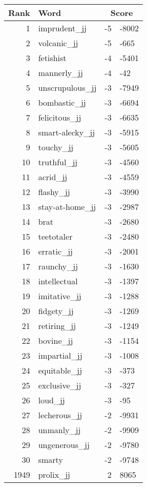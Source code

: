 \begin{longtable}[!htbp]{| rlr@{.}l |}
    \hline
    \textbf{Rank} & \textbf{Word} & \multicolumn{2}{c|}{\textbf{Score}} \\
    \hline
    \endhead
    1 & imprudent\_jj & -5 & -8002 \\
    2 & volcanic\_jj & -5 & -665 \\
    3 & fetishist & -4 & -5401 \\
    4 & mannerly\_jj & -4 & -42 \\
    5 & unscrupulous\_jj & -3 & -7949 \\
    6 & bombastic\_jj & -3 & -6694 \\
    7 & felicitous\_jj & -3 & -6635 \\
    8 & smart-alecky\_jj & -3 & -5915 \\
    9 & touchy\_jj & -3 & -5605 \\
    10 & truthful\_jj & -3 & -4560 \\
    11 & acrid\_jj & -3 & -4559 \\
    12 & flashy\_jj & -3 & -3990 \\
    13 & stay-at-home\_jj & -3 & -2987 \\
    14 & brat & -3 & -2680 \\
    15 & teetotaler & -3 & -2480 \\
    16 & erratic\_jj & -3 & -2001 \\
    17 & raunchy\_jj & -3 & -1630 \\
    18 & intellectual & -3 & -1397 \\
    19 & imitative\_jj & -3 & -1288 \\
    20 & fidgety\_jj & -3 & -1269 \\
    21 & retiring\_jj & -3 & -1249 \\
    22 & bovine\_jj & -3 & -1154 \\
    23 & impartial\_jj & -3 & -1008 \\
    24 & equitable\_jj & -3 & -373 \\
    25 & exclusive\_jj & -3 & -327 \\
    26 & loud\_jj & -3 & -95 \\
    27 & lecherous\_jj & -2 & -9931 \\
    28 & unmanly\_jj & -2 & -9909 \\
    29 & ungenerous\_jj & -2 & -9780 \\
    30 & smarty & -2 & -9748 \\
    1949 & prolix\_jj & 2 & 8065 \\

\end{longtable}
